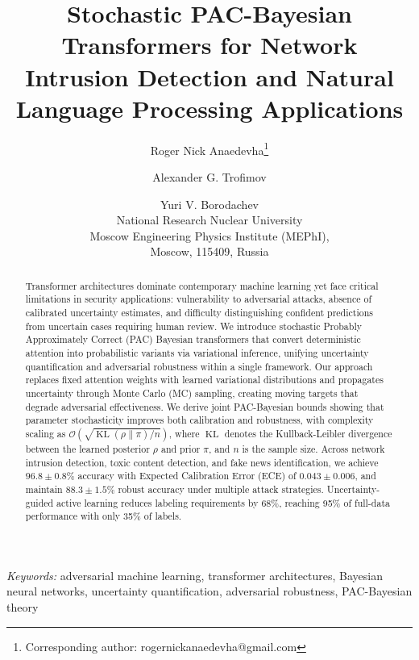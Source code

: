 \documentclass[12pt,a4paper]{article}
\theoremstyle{definition}
\DeclareMathOperator{\KL}{KL}
\begin{document}
\title{Stochastic PAC-Bayesian Transformers for Network Intrusion Detection and Natural Language Processing Applications}

\author{Roger Nick Anaedevha\thanks{Corresponding author: rogernickanaedevha@gmail.com} \and Alexander G. Trofimov \and Yuri V. Borodachev\\
\small National Research Nuclear University \\ 
\small Moscow Engineering Physics Institute (MEPhI), \\ 
\small Moscow, 115409, Russia}

\date{}
\maketitle

\begin{abstract}
\noindent Transformer architectures dominate contemporary machine learning yet face critical limitations in security applications: vulnerability to adversarial attacks, absence of calibrated uncertainty estimates, and difficulty distinguishing confident predictions from uncertain cases requiring human review. We introduce stochastic Probably Approximately Correct (PAC) Bayesian transformers that convert deterministic attention into probabilistic variants via variational inference, unifying uncertainty quantification and adversarial robustness within a single framework. Our approach replaces fixed attention weights with learned variational distributions and propagates uncertainty through Monte Carlo (MC) sampling, creating moving targets that degrade adversarial effectiveness. We derive joint PAC-Bayesian bounds showing that parameter stochasticity improves both calibration and robustness, with complexity scaling as $\mathcal{O}(\sqrt{\KL(\rho\|\pi)/n})$, where $\KL$ denotes the Kullback-Leibler divergence between the learned posterior $\rho$ and prior $\pi$, and $n$ is the sample size. Across network intrusion detection, toxic content detection, and fake news identification, we achieve $96.8\pm0.8\%$ accuracy with Expected Calibration Error (ECE) of $0.043\pm0.006$, and maintain $88.3\pm1.5\%$ robust accuracy under multiple attack strategies. Uncertainty-guided active learning reduces labeling requirements by 68\%, reaching 95\% of full-data performance with only 35\% of labels.
\end{abstract}

\noindent\textit{Keywords:} adversarial machine learning, transformer architectures, Bayesian neural networks, uncertainty quantification, adversarial robustness, PAC-Bayesian theory
\end{document}
